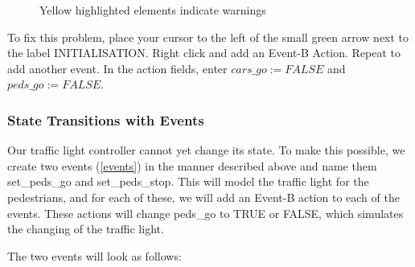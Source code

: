 \begin{figure}[!ht]
\begin{center}
	\caption{Yellow highlighted elements indicate warnings}
	\label{fig_tut_03_warning}
\end{center}
\end{figure}

To fix this problem, place your cursor to the left of the small green arrow next to the label \textsf{INITIALISATION}. Right click and add an \textsf{Event-B Action}. Repeat to add another event. In the action fields, enter $cars\_go :=  FALSE$ and $peds\_go :=  FALSE$.



\subsubsection{State Transitions with Events}

Our traffic light controller cannot yet change its state.  To make this possible, we create two events (\ref{events}) in the manner described above and name them \textsf{set\_peds\_go} and \textsf{set\_peds\_stop}. This will model the traffic light for the pedestrians, and for each of these, we will add an Event-B action to each of the events. These actions will change \textsf{peds\_go} to \textsf{TRUE} or \textsf{FALSE}, which simulates the changing of the traffic light.


The two events will look as follows:


